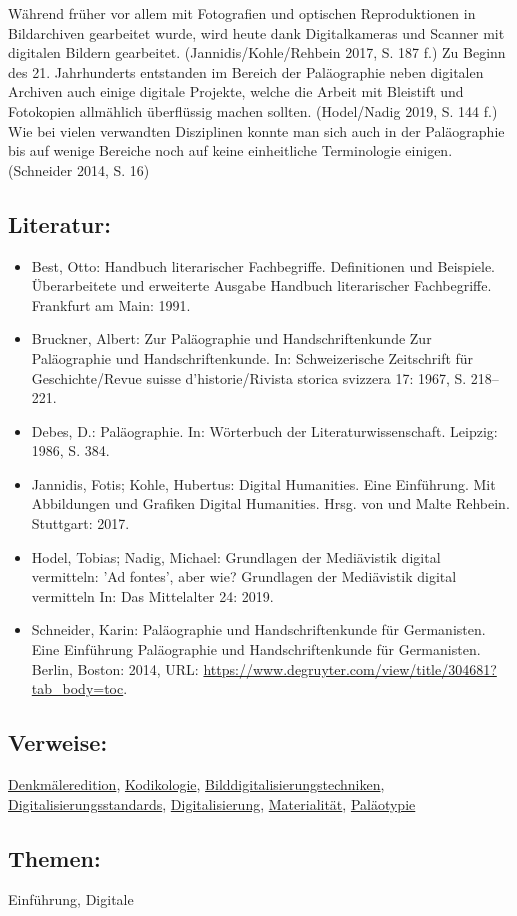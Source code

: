 \documentclass{article}
\begin{document}
        Während früher vor allem mit Fotografien und optischen Reproduktionen in Bildarchiven gearbeitet wurde, wird heute dank Digitalkameras und Scanner mit digitalen Bildern gearbeitet. (Jannidis/Kohle/Rehbein 2017, S. 187 f.) Zu Beginn des 21. Jahrhunderts entstanden im Bereich der Paläographie neben digitalen Archiven auch einige digitale Projekte, welche die Arbeit mit Bleistift und Fotokopien allmählich überflüssig machen sollten. (Hodel/Nadig 2019, S. 144 f.) Wie bei vielen verwandten Disziplinen konnte man sich auch in der Paläographie bis auf wenige Bereiche noch auf keine einheitliche Terminologie einigen. (Schneider 2014, S. 16)\\
            
        \subsection*{Literatur:}\begin{itemize}\item Best, Otto: Handbuch literarischer Fachbegriffe. Definitionen und Beispiele. Überarbeitete und erweiterte Ausgabe Handbuch literarischer Fachbegriffe. Frankfurt am Main: 1991.\item Bruckner, Albert: Zur Paläographie und Handschriftenkunde Zur Paläographie und Handschriftenkunde. In: Schweizerische Zeitschrift für Geschichte/Revue suisse d'historie/Rivista storica svizzera 17: 1967, S. 218–221.\item Debes, D.: Paläographie. In: Wörterbuch der Literaturwissenschaft. Leipzig: 1986, S. 384.\item Jannidis, Fotis; Kohle, Hubertus: Digital Humanities. Eine Einführung. Mit Abbildungen und Grafiken Digital Humanities. Hrsg. von  und Malte Rehbein. Stuttgart: 2017.\item Hodel, Tobias; Nadig, Michael: Grundlagen der Mediävistik digital vermitteln: 'Ad fontes', aber wie? Grundlagen der Mediävistik digital vermitteln In: Das Mittelalter 24: 2019.\item Schneider, Karin: Paläographie und Handschriftenkunde für Germanisten. Eine Einführung Paläographie und Handschriftenkunde für Germanisten. Berlin, Boston: 2014, URL: \url{https://www.degruyter.com/view/title/304681?tab_body=toc}.\end{itemize}\subsection*{Verweise:}\href{https://gams.uni-graz.at/o:konde.55}{Denkmäleredition}, \href{https://gams.uni-graz.at/o:konde.103}{Kodikologie}, \href{https://gams.uni-graz.at/o:konde.37}{Bilddigitalisierungstechniken}, \href{https://gams.uni-graz.at/o:konde.64}{Digitalisierungsstandards}, \href{https://gams.uni-graz.at/o:konde.60}{Digitalisierung}, \href{https://gams.uni-graz.at/o:konde.127}{Materialität}, \href{https://gams.uni-graz.at/o:konde.221}{Paläotypie}\subsection*{Themen:}Einführung, Digitale 
\end{document}
